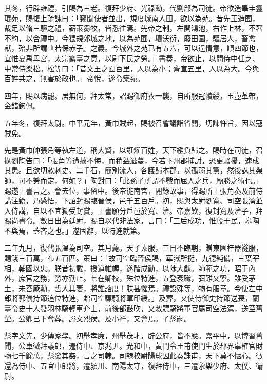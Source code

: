 \begin{pinyinscope}
其冬，行辟雍禮，引賜為三老。復拜少府、光祿勳，代劉郃為司徒。帝欲造畢圭靈琨苑，賜復上疏諫曰：「竊聞使者並出，規度城南人田，欲以為苑。昔先王造囿，裁足以脩三驅之禮，薪萊芻牧，皆悉往焉。先帝之制，左開鴻池，右作上林，不奢不約，以合禮中。今猥規郊城之地，以為苑囿，壞沃衍，廢田園，驅居人，畜禽獸，殆非所謂『若保赤子』之義。今城外之苑已有五六，可以逞情意，順四節也，宜惟夏禹卑宮，太宗露臺之意，以尉下民之勞。」書奏，帝欲止，以問侍中任芝、中常侍樂松。松等曰：「昔文王之囿百里，人以為小；齊宣五里，人以為大。今與百姓共之，無害於政也。」帝悅，遂令築苑。

四年，賜以病罷。居無何，拜太常，詔賜御府衣一襲，自所服冠幘綬，玉壺革帶，金錯鉤佩。

五年冬，復拜太尉。中平元年，黃巾賊起，賜被召會議詣省閤，切諫忤旨，因以寇賊免。

先是黃巾帥張角等執左道，稱大賢，以誑燿百姓，天下繈負歸之。賜時在司徒，召掾劉陶告曰：「張角等遭赦不悔，而稍益滋蔓，今若下州郡捕討，恐更騷擾，速成其患。且欲切敕刺史、二千石，簡別流人，各護歸本郡，以孤弱其黨，然後誅其渠帥，可不勞而定，何如？」陶對曰：「此孫子所謂不戰而屈人之兵，廟勝之術也。」賜遂上書言之。會去位，事留中。後帝徙南宮，閱錄故事，得賜所上張角奏及前侍講注籍，乃感悟，下詔封賜臨晉侯，邑千五百戶。初，賜與太尉劉寬、司空張濟並入侍講，自以不宜獨受封賞，上書願分戶邑於寬、濟。帝嘉歎，復封寬及濟子，拜賜尚書令。數日出為廷尉，賜自以代非法家，言曰：「三后成功，惟殷于民，皋陶不與焉，蓋吝之也。」遂固辭，以特進就第。

二年九月，復代張溫為司空。其月薨。天子素服，三日不臨朝，贈東園梓器襚服，賜錢三百萬，布五百匹。策曰：「故司空臨晉侯賜，華嶽所挺，九德純備，三葉宰相，輔國以忠。朕昔初載，授道帷幄，遂階成勳，以陟大猷。師範之功，昭于內外，庶官之務，勞亦勤止。七在卿校，殊位特進，五登袞職，弭難乂寧。雖受茅土，未荅厥勳，哲人其萎，將誰諮度！朕甚懼焉。禮設殊等，物有服章。今使左中郎將郭儀持節追位特進，贈司空驃騎將軍印綬。」及葬，又使侍御史持節送喪，蘭臺令史十人發羽林騎輕車介士，前後部鼓吹，又敕驃騎將軍官屬司空法駕，送至舊塋。公卿已下會葬。謚文烈侯。及小祥，又會焉。子彪嗣。

彪字文先，少傳家學。初舉孝廉，州舉茂才，辟公府，皆不應。熹平中，以博習舊聞，公車徵拜議郎，遷侍中、京兆尹。光和中，黃門令王甫使門生於郡界辜榷官財物七千餘萬，彪發其姦，言之司隸。司隸校尉陽球因此奏誅甫，天下莫不愜心。徵還為侍中、五官中郎將，遷潁川、南陽太守，復拜侍中，三遷永樂少府、太僕、衛尉。


\end{pinyinscope}
